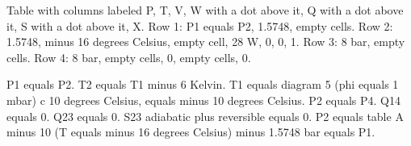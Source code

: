 Table with columns labeled P, T, V, W with a dot above it, Q with a dot above it, S with a dot above it, X.  
Row 1: P1 equals P2, 1.5748, empty cells.  
Row 2: 1.5748, minus 16 degrees Celsius, empty cell, 28 W, 0, 0, 1.  
Row 3: 8 bar, empty cells.  
Row 4: 8 bar, empty cells, 0, empty cells, 0.

P1 equals P2.  
T2 equals T1 minus 6 Kelvin.  
T1 equals diagram 5 (phi equals 1 mbar) c 10 degrees Celsius, equals minus 10 degrees Celsius.  
P2 equals P4.  
Q14 equals 0.  
Q23 equals 0.  
S23 adiabatic plus reversible equals 0.  
P2 equals table A minus 10 (T equals minus 16 degrees Celsius) minus 1.5748 bar equals P1.